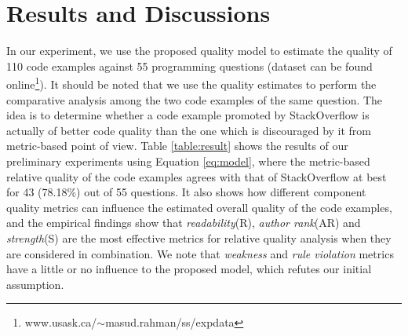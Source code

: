 \documentclass[conference]{IEEEtran}
\begin{document}
\vspace{-.1cm}
\section{Results and Discussions}
\label{sec:experiment}
In our experiment, we use the proposed quality model to estimate the quality of 110 code examples against 55 programming questions (dataset can be found online\footnote{www.usask.ca/$\sim$masud.rahman/ss/expdata}). It should be noted that we use the quality estimates to perform the comparative analysis among the two code examples of the same question. The idea is to determine whether a code example promoted by StackOverflow is actually of better code quality than the one which is discouraged by it from metric-based point of view. Table \ref{table:result} shows the results of our preliminary experiments using Equation \eqref{eq:model}, where the metric-based relative quality of the code examples agrees with that of StackOverflow at best for 43 (78.18\%)  out of 55 questions. It also shows how different component quality metrics can influence the estimated overall quality of the code examples, and the empirical findings show that \emph{readability}(R), \emph{author rank}(AR) and \emph{strength}(S) are the most effective metrics for relative quality analysis when they are considered in combination. We note that \emph{weakness} and \emph{rule violation} metrics have a little or no influence to the proposed model, which refutes our initial assumption.
\end{document}
